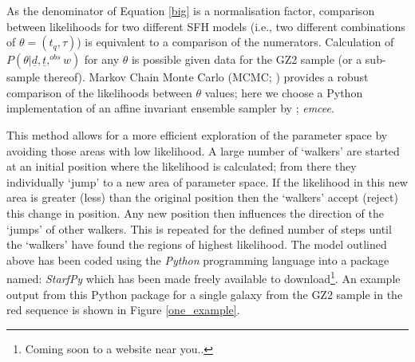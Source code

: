 \documentclass[useAMS,usenatbib]{mn2e}
\def\changed    {\color{titlecol} }
\begin{document}
As the denominator of Equation \ref{big} is a normalisation factor, comparison between likelihoods for two different SFH models (i.e., two different combinations of $\theta = (t_q, \tau)$) is equivalent to a comparison of the numerators. Calculation of $P(\theta|\underline{d}, \underline{t},^{obs} w)$  for any $\theta$ is possible given data for the GZ2 sample (or a sub-sample thereof). Markov Chain Monte Carlo (MCMC; \citealt{MacKay, Dan, GW10}) provides a robust comparison of the likelihoods between $\theta$ values; here we choose a Python implementation of an affine invariant ensemble sampler by \cite{Dan}; \emph{emcee}.

This method allows for a more efficient exploration of the parameter space by avoiding those areas with low likelihood. A large number of `walkers' are started at an initial position where the likelihood is calculated; from there they individually `jump' to a new area of parameter space. If the likelihood in this new area is greater (less) than the original position then the `walkers' accept (reject) this change in position. Any new position then influences the direction of the  `jumps' of other walkers.  This is repeated for the defined number of steps until the `walkers' have found the regions of highest likelihood. The model outlined above has been coded using the \emph{Python} programming language into a package named: \emph{StarfPy} which has been made freely available to download\footnote{Coming soon to a website near you..}. {\changed An example output from this Python package for a single galaxy from the GZ2 sample in the red sequence is shown in Figure \ref{one_example}.}

\end{document}
